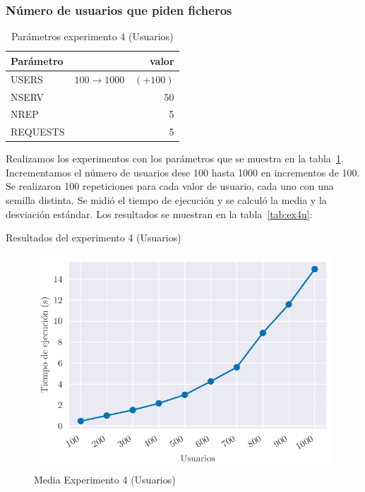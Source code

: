 \subsubsection{Número de usuarios que piden ficheros}

\begin{table}[H]
    \caption{Parámetros experimento 4 (Usuarios)}%
    \label{tab:ex4u_par}
    \begin{center}
    \begin{tabular}{lr}
    \toprule
    Parámetro & valor \\
    \midrule
    USERS & $100 \to 1000 \quad (+100)$ \\
    NSERV & 50 \\
    NREP & 5 \\
    REQUESTS & 5\\
    \bottomrule
    \end{tabular}
    \end{center}
\end{table}

Realizamos los experimentos con los parámetros que se muestra en la tabla~\ref{tab:ex4u_par}. Incrementamos
el número de usuarios dese 100 hasta 1000 en incrementos de 100. Se realizaron 100 repeticiones para
cada valor de usuario, cada uno con una semilla distinta. Se midió el tiempo de ejecución y se calculó la media
y la desviación estándar. Los resultados se muestran en la tabla~\ref{tab:ex4u}:

\begin{table}[H]
    \caption{Resultados del experimento 4 (Usuarios)}%
    \label{tab:ex4u}
    \begin{center}
    
    \end{center}
\end{table}


\begin{figure}[H]
    \centering
    \includegraphics{include/plots/ex4_u_mean_time.pdf}
    \caption{Media Experimento 4 (Usuarios)}%
    \label{fig:ex4u_mean}
\end{figure}

